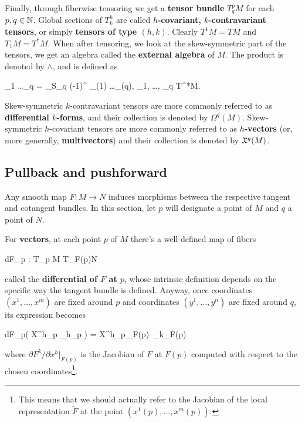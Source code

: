 Finally, through fiberwise tensoring we get a \textbf{tensor bundle} $T^p_q M$ for each $p, q \in \mathbb{N}$. Global sections of $T^h_k$ are called \textbf{$h$-covariant, $k$-contravariant tensors}, or simply \textbf{tensors of type $(h, k)$}. Clearly $T^1 M = TM$ and $T_1 M = T^* M$. When after tensoring, we look at the skew-symmetric part of the tensors, we get an algebra called the \textbf{external algebra} of $M$. The product is denoted by $\wedge$, and is defined as
\begin{eqalign}
	\xi_1 \wedge \ldots \wedge \xi_q = \sum_{\sigma \in S_q} (-1)^{\sign \sigma} \xi_{\sigma(1)} \tens \ldots \tens \xi_{\sigma(q)}, \quad \forall \xi_1, \ldots, \xi_q \in T^*M.
\end{eqalign}
Skew-symmetric $k$-contravariant tensors are more commonly referred to as \textbf{differential $k$-forms}, and their collection is denoted by $\Omega^q(M)$. Skew-symmetric $h$-covariant tensors are more commonly referred to as \textbf{$h$-vectors} (or, more generally, \textbf{multivectors}) and their collection is denoted by $\mathfrak{X}^q(M)$.

\subsection{Pullback and pushforward}
Any smooth map $F: M \to N$ induces morphisms between the respective tangent and cotangent bundles. In this section, let $p$ will designate a point of $M$ and $q$ a point of $N$.

\begin{construction}
\label{const:diff_at_P}
	For \textbf{vectors}, at each point $p$ of $M$ there's a well-defined map of fibers
	\begin{eqalign}
		dF_p : T_p M \to T_{F(p)}N
	\end{eqalign}
	called the \textbf{differential of $F$ at $p$}, whose intrinsic definition depends on the specific way the tangent bundle is defined. Anyway, once coordinates $(x^1, \ldots, x^m)$ are fixed around $p$ and coordinates $(y^1, \ldots, y^n)$ are fixed around $q$, its expression becomes
	\begin{eqalign}
		dF_p\left( X^h\vert_p \partial_h\vert_p \right) = X^h\vert_p\,\vert_{F(p)}\, \partial_k\vert_{F(p)}
	\end{eqalign}
	where $\partial F^k /\partial x^h \vert_{F(p)}$ is the Jacobian of $F$ at $F(p)$ computed with respect to the chosen coordinates\footnote{This means that we should actually refer to the Jacobian of the local representation $\tilde F$ at the point $(x^1(p),\ldots,x^m(p))$.}.
\end{construction}

